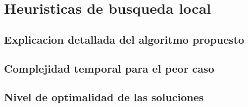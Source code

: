 \section{Heuristicas de busqueda local}
\subsection{Explicacion detallada del algoritmo propuesto}
\subsection{Complejidad temporal para el peor caso}
\subsection{Nivel de optimalidad de las soluciones}%
